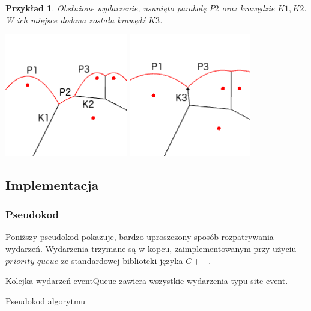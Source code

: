 \documentclass[declaration,shortabstract, inz]{iithesis}
\theoremstyle{definition} \newtheorem{definition}{Definicja}[]
\theoremstyle{plain} \newtheorem{remark}[definition]{Obserwacja}
\theoremstyle{plain} \newtheorem{theorem}[definition]{Twierdzenie}
\theoremstyle{plain} \newtheorem{example}{Przykład}[definition]
\theoremstyle{plain} \newtheorem{lemma}[definition]{Lemat}
\begin{document}
 \begin{example}
	Obsłużone wydarzenie, usunięto parabolę $P2$ oraz krawędzie $K1, K2$. W ich miejsce dodana została krawędź $K3$.
	
	\begin{center}
		\includegraphics[width=0.4\textwidth]{ExampleCircleEvent1}
		\qquad
		\includegraphics[width=0.4\textwidth]{ExampleCircleEvent2}
	\end{center}
\end{example}

\subsection{Implementacja}

\subsubsection{Pseudokod}
Poniższy pseudokod pokazuje, bardzo uproszczony sposób rozpatrywania wydarzeń. Wydarzenia trzymane są w kopcu, zaimplementowanym przy użyciu $priority\_queue$ ze standardowej biblioteki języka $C++$.

\begin{algorithm}[H]
\SetAlgoLined
	Kolejka wydarzeń eventQueue zawiera wszystkie wydarzenia typu site event.\\
 \caption{Pseudokod algorytmu}
\end{algorithm}
\end{document}
